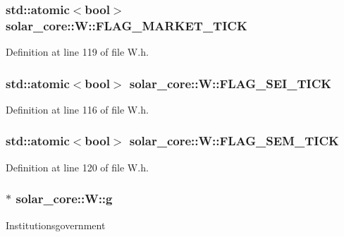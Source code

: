 \subsubsection[{F\+L\+A\+G\+\_\+\+M\+A\+R\+K\+E\+T\+\_\+\+T\+I\+C\+K}]{\setlength{\rightskip}{0pt plus 5cm}std\+::atomic$<$bool$>$ solar\+\_\+core\+::\+W\+::\+F\+L\+A\+G\+\_\+\+M\+A\+R\+K\+E\+T\+\_\+\+T\+I\+C\+K}\label{classsolar__core_1_1_w_a7aa8b882244539e098e45207045d7d88}


Definition at line 119 of file W.\+h.

\hypertarget{classsolar__core_1_1_w_a65d2047e574ed6201a8e21ec1ba1bec4}{}
\subsubsection[{F\+L\+A\+G\+\_\+\+S\+E\+I\+\_\+\+T\+I\+C\+K}]{\setlength{\rightskip}{0pt plus 5cm}std\+::atomic$<$bool$>$ solar\+\_\+core\+::\+W\+::\+F\+L\+A\+G\+\_\+\+S\+E\+I\+\_\+\+T\+I\+C\+K}\label{classsolar__core_1_1_w_a65d2047e574ed6201a8e21ec1ba1bec4}


Definition at line 116 of file W.\+h.

\hypertarget{classsolar__core_1_1_w_ae383b7a595cb28d52aa747fc7e5bb619}{}
\subsubsection[{F\+L\+A\+G\+\_\+\+S\+E\+M\+\_\+\+T\+I\+C\+K}]{\setlength{\rightskip}{0pt plus 5cm}std\+::atomic$<$bool$>$ solar\+\_\+core\+::\+W\+::\+F\+L\+A\+G\+\_\+\+S\+E\+M\+\_\+\+T\+I\+C\+K}\label{classsolar__core_1_1_w_ae383b7a595cb28d52aa747fc7e5bb619}


Definition at line 120 of file W.\+h.

\hypertarget{classsolar__core_1_1_w_a9e50ef0da579cdfc3da22c16a492bc44}{}
\subsubsection[{g}]{$\ast$ solar\+\_\+core\+::\+W\+::g}\label{classsolar__core_1_1_w_a9e50ef0da579cdfc3da22c16a492bc44}
Institutionsgovernment 

